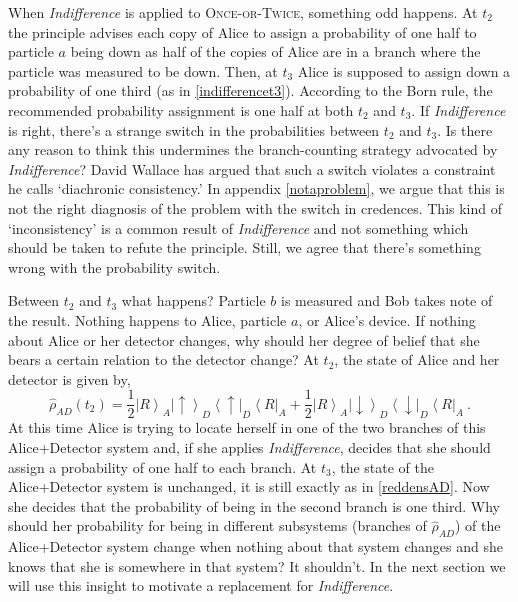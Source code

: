 \documentclass[12pt,onecolumn,secnumarabic,amsmath,amssymb,balancelastpage,nofootinbib]{article}
\newcommand{\bra}[1]{\ensuremath{\left\langle#1\right|}}
\newcommand{\ket}[1]{\ensuremath{\left|#1\right\rangle}}
\begin{document}
When \emph{Indifference} is applied to \textsc{Once-or-Twice}, something odd happens.  At $t_2$ the principle advises each copy of Alice to assign a probability of one half to particle $a$ being down as half of the copies of Alice are in a branch where the particle was measured to be down.  Then, at $t_3$ Alice is supposed to assign down a probability of one third (as in \eqref{indifferencet3}).  According to the Born rule, the recommended probability assignment is one half at both $t_2$ and $t_3$.  If \emph{Indifference} is right, there's a strange switch in the probabilities between $t_2$ and $t_3$.  Is there any reason to think this undermines the branch-counting strategy advocated by \emph{Indifference}?  David Wallace has argued that such a switch violates a constraint he calls `diachronic consistency.' In appendix \ref{notaproblem}, we argue that this is not the right diagnosis of the problem with the switch in credences.  This kind of `inconsistency' is a common result of \emph{Indifference} and not something which should be taken to refute the principle.  Still, we agree that there's something wrong with the probability switch.

Between $t_2$ and $t_3$ what happens?  Particle $b$ is measured and Bob takes note of the result.  Nothing happens to Alice, particle $a$, or Alice's device.  If nothing about Alice or her detector changes, why should her degree of belief that she bears a certain relation to the detector change?  At $t_2$, the state of Alice and her detector is given by,
\begin{equation}
\widehat{\rho}_{AD}(t_2)=\frac{1}{2}\ket{R}_A\ket{\uparrow}_{D}\bra{\uparrow}_{D}\bra{R}_A+\frac{1}{2}\ket{R}_A\ket{\downarrow}_{D}\bra{\downarrow}_{D}\bra{R}_A\ .
\label{reddensAD}
\end{equation}
At this time Alice is trying to locate herself in one of the two branches of this Alice+Detector system and, if she applies \emph{Indifference}, decides that she should assign a probability of one half to each branch.  At $t_3$, the state of the Alice+Detector system is unchanged, it is still exactly as in \eqref{reddensAD}.  Now she decides that the probability of being in the second branch is one third.  Why should her probability for being in different subsystems (branches of $\widehat{\rho}_{AD}$) of the Alice+Detector system change when nothing about that system changes and she knows that she is somewhere in that system?  It shouldn't.  In the next section we will use this insight to motivate a replacement for \emph{Indifference}.
\end{document}
